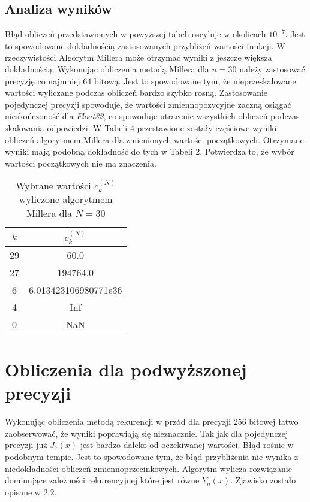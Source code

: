 \documentclass{article}
\begin{document}
\subsection{Analiza wyników}
Błąd obliczeń przedstawionych w powyższej tabeli oscyluje w okolicach $10^{-7}$. Jest to spowodowane dokładnością zastosowanych przybliżeń wartości funkcji. W rzeczywistości Algorytm Millera może otrzymać wyniki z jeszcze większa dokładnością. Wykonując obliczenia metodą Millera dla $n = 30$ należy zastosować precyzję co najmniej $64$ bitową. Jest to spowodowane tym, że nieprzeskalowane wartości wyliczane podczas obliczeń bardzo szybko rosną. Zastosowanie pojedynczej precyzji spowoduje, że wartości zmiennopozycyjne zaczną osiągać nieskończoność dla \textit{Float32}, co spowoduje utracenie wszystkich obliczeń podczas skalowania odpowiedzi. W Tabeli $4$ przestawione zostały częściowe wyniki obliczeń algorytmem Millera dla zmienionych wartości początkowych. Otrzymane wyniki mają podobną dokładność do tych w Tabeli $2$. Potwierdza to, że wybór wartości początkowych nie ma znaczenia.

\begin{center}
\begin{table}[H]
\centering
\caption{Wybrane wartości $c_{k}^{(N)}$ wyliczone algorytmem Millera dla $N = 30$}
\begin{tabular}{||c||c||} \hline
\label{tab:2}
\textbf{$k$} & \textbf{$c_{k}^{(N)}$}  \\ \hline
29 &  60.0 \\
\hline
27 &  194764.0 \\
\hline
6 &  6.013423106980771e36 \\
\hline
4 &  Inf \\
\hline
0 &  NaN \\
\hline
\end{tabular}
\end{table}
\end{center}

\section{Obliczenia dla podwyższonej precyzji}
Wykonując obliczenia metodą rekurencji w przód dla precyzji $256$ bitowej łatwo zaobserwować, że wyniki poprawiają się nieznacznie. Tak jak dla pojedynczej precyzji już $J_7(x)$ jest bardzo daleko od oczekiwanej wartości. Błąd rośnie w podobnym tempie. Jest to spowodowane tym, że błąd przybliżenia nie wynika z niedokładności obliczeń zmiennoprzecinkowych. Algorytm wylicza rozwiązanie dominujące zależności rekurencyjnej które jest równe $Y_n(x)$. Zjawisko zostało opisane w $2.2$.
\end{document}
